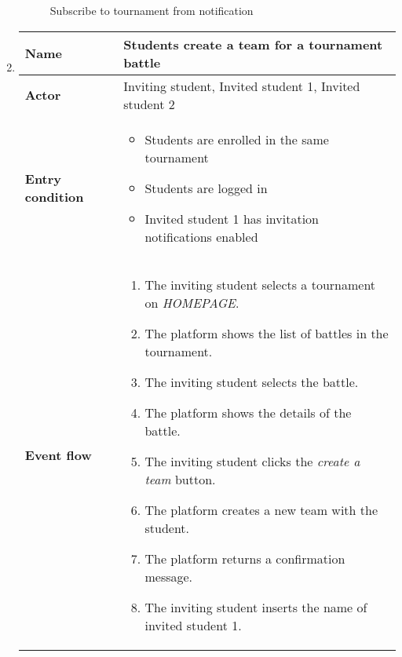 \begin{enumerate}[label=\textbf{UC\arabic*}:,leftmargin=1.3cm]
          \begin{figure}[H]
              \centering
              \caption{Subscribe to tournament from notification}
              \label{fig:Subscribe to tournament from notification}
          \end{figure}
          \pagebreak
    \item \textbf{}
          \begin{table}[H]
              \centering
              \begin{tabular}{|l|p{11.9cm}|}
                  \hline
                  \textbf{Name}            & Students create a team for a tournament battle                              \\\hline
                  \textbf{Actor}           & Inviting student, Invited student 1, Invited student 2                      \\\hline
                  \textbf{Entry condition} &
                  \begin{itemize}
                      \item Students are enrolled in the same tournament
                      \item Students are logged in
                      \item Invited student 1 has invitation notifications enabled
                  \end{itemize}                                            \\\hline
                  \textbf{Event flow}      &
                  \begin{enumerate}[label=\arabic*.]
                      \item The inviting student selects a tournament on \emph{HOMEPAGE}.
                      \item The platform shows the list of battles in the tournament.
                      \item The inviting student selects the battle.
                      \item The platform shows the details of the battle.
                      \item The inviting student clicks the \emph{create a team} button.
                      \item The platform creates a new team with the student.
                      \item The platform returns a confirmation message.
                      \item The inviting student inserts the name of invited student 1.

\end{enumerate}
\end{tabular}
\end{table}
\end{enumerate}
